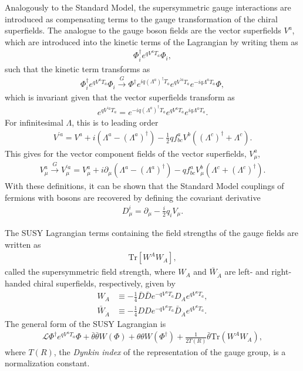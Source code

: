 Analogously to the Standard Model, the supersymmetric gauge interactions are introduced as compensating terms to the gauge transformation of the chiral superfields. The analogue to the gauge boson fields are the vector superfields $V^a$, which are introduced into the kinetic terms of the Lagrangian by writing them as
\begin{align}
	\Phi^\dag_i e^{q V^a T_a}\Phi_i,
\end{align}
such that the kinetic term transforms as
\begin{align}
	\Phi_i^\dag e^{q V^a T_a}\Phi_i \overset{G}{\to} \Phi^\dag e^{iq(\Lambda^a)^\dag T_a}e^{qV^{'a}T_a}e^{-iq\Lambda^a T_a}\Phi,
\end{align}
which is invariant given that the vector superfields transform as
\begin{align}
	e^{qV^{'a} T_a} = e^{-iq(\Lambda^a)^\dag T_a}e^{qV^a T_a}e^{iq\Lambda^a T_a}.
\end{align}
For infinitesimal $\Lambda$, this is to leading order
\begin{align}
	V^{'a} = V^a + i(\Lambda^a - (\Lambda^a)^\dag) - \frac{1}{2}qf^a_{bc} V^b ((\Lambda^c)^\dag + \Lambda^c).
\end{align}
This gives for the vector component fields of the vector superfields, $V_\mu^a$,
\begin{align}
	V^a_\mu \overset{G}{\to} V^{'a}_\mu = V_\mu^a + i\partial_\mu(\Lambda^a - (\Lambda^a)^\dag) - qf^a_{bc} V_\mu^b (\Lambda^c + (\Lambda^{c})^\dag).
\end{align}
With these definitions, it can be shown that the Standard Model couplings of fermions with bosons are recovered by defining the covariant derivative
\begin{align}
	D_\mu^i = \partial_\mu - \frac{i}{2} q_i V_\mu.
\end{align}

The SUSY Lagrangian terms containing the field strengths of the gauge fields are written as
\begin{align}
	\mathrm{Tr}[W^A W_A],
\end{align}
called the supersymmetric field strength, where $W_A$ and $\bar W_{\dot A}$ are left- and right-handed chiral superfields, respectively, given by
\begin{align}
	W_A &\equiv -\frac{1}{4}\bar D\bar D e^{-qV^aT_a} D_A e^{qV^a T_a},\\
	\bar W_{\dot A} &\equiv -\frac{1}{4} D D e^{-qV^aT_a} \bar D_{\dot A} e^{qV^a T_a}.
\end{align}
The general form of the SUSY Lagrangian is
\begin{align}
	\mathcal{L} \Phi^\dag e^{qV^a T_a}\Phi + \bar\theta\bar\theta W(\Phi) + \theta\theta W(\Phi^\dag) + \frac{1}{2T(R)}\bar\theta \mathrm{Tr}(W^A W_A),
\end{align}
where $T(R)$, the {\it Dynkin index} of the representation of the gauge group, is a normalization constant.



